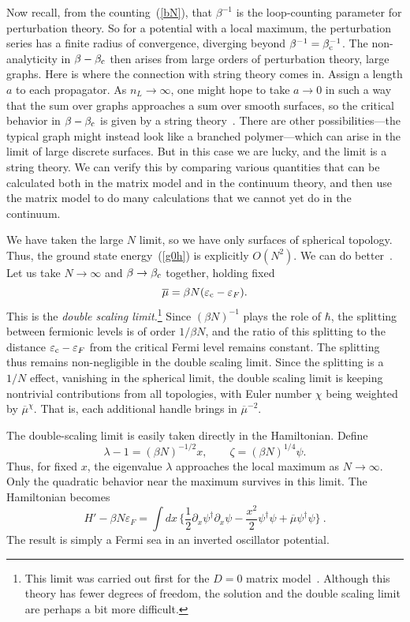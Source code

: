 Now recall, from the counting~(\ref{bN}), that $\beta^{-1}$ is the
loop-counting parameter for perturbation theory.  So for a
potential with a local maximum, the perturbation series has a finite
radius of convergence, diverging beyond $\beta^{-1} = \beta_{\rm
c}^{-1}$. The non-analyticity in $\beta - \beta_{\rm c}$ then
arises from large orders of perturbation theory, large graphs. 
Here is where the connection with string theory comes in.  Assign a
length $a$ to each propagator.  As $n_L \to \infty$, one might hope
to take $a \to 0$ in such a way that the sum over graphs approaches
a sum over smooth surfaces, so the critical behavior in $\beta -
\beta_{\rm c}$ is given by a string theory~\cite{KMs2}.  There are
other possibilities---the typical graph might instead look like a
branched polymer---which can arise in the limit of large discrete
surfaces.  But in this case we are lucky, and the limit is a string
theory.  We can verify this by comparing various quantities that
can be calculated both in the matrix model and in the continuum
theory, and then use the matrix model to do many calculations that
we cannot yet do in the continuum.

We have taken the large $N$ limit, so we have only surfaces of
spherical topology.  Thus, the ground state energy~(\ref{g0h}) is
explicitly $O(N^2)$.  We can do better~\cite{c1refs}.
Let us take $N \to\infty$
and $\beta \to \beta_{\rm c}$ together, holding fixed
\begin{equation}
\overline\mu = \beta N (\varepsilon_{\rm c} - \varepsilon_F) .
\end{equation}
This is the {\it double scaling limit.}\footnote
{This limit was carried out first for the $D=0$ matrix
model~\cite{c0refs}.
Although this theory has fewer degrees of freedom, the solution and
the double scaling limit are perhaps a bit more difficult.}
Since $(\beta N)^{-1}$
plays the role of $\hbar$, the splitting between fermionic levels is
of order $1/\beta N$, and the ratio of this splitting to the
distance
$\varepsilon_{\rm c} - \varepsilon_F$ from the critical Fermi level
remains constant.  The splitting thus remains non-negligible in the
double scaling limit.  Since the splitting is a $1/N$ effect,
vanishing in the spherical limit, the double scaling limit is
keeping nontrivial contributions from all topologies, 
with Euler number
$\chi$ being weighted by $\overline\mu^\chi$.  That is, each
additional handle brings in $\overline \mu^{-2}$.

The double-scaling limit is easily taken directly in the
Hamiltonian.  Define
\begin{equation}
\lambda - 1 = (\beta N)^{-1/2} x, \qquad 
\zeta = (\beta N)^{1/4} \psi.
\end{equation}
Thus, for fixed $x$, the eigenvalue
$\lambda$ approaches the local maximum as $N
\to \infty$.  Only the quadratic behavior near the maximum survives
in this limit.  The Hamiltonian becomes
\begin{equation}
H' - \beta N \varepsilon_F =  \int dx\, \biggl\{ \frac{1}{2}
\partial_x \psi^\dagger \partial_x \psi 
-\frac{x^2}{2} \psi^\dagger\psi + \overline\mu \psi^\dagger\psi
\biggr\}\ .
\label{2qds}
\end{equation}
The result is simply a Fermi sea in an inverted oscillator
potential.

